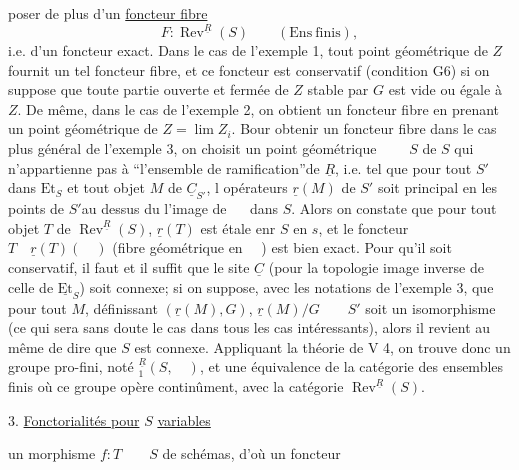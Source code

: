 %
poser de plus d'un \uline{foncteur fibre}
\[
F:\operatorname{Rev}^{\underline{R}}(S)\qquad(\mathrm{Ens\ finis}),
\]
i.e. d'un foncteur exact. Dans le cas de l'exemple 1, tout point géométrique de $Z$ fournit un tel foncteur fibre, et ce foncteur est conservatif (condition G6) si on suppose que toute partie ouverte et fermée de $Z$ stable par $G$ est vide ou égale à $Z$. De même, dans le cas de l'exemple 2, on obtient un  foncteur fibre en prenant un point géométrique de $Z=\lim Z_i$. Bour obtenir un foncteur fibre dans le cas plus général de l'exemple 3, on choisit un point géométrique $\qquad S$ de $S$  qui n'appartienne pas à ``l'ensemble de ramification''de $\underline{R}$, i.e. tel que pour tout $S'$ dans $\mathrm{Et}_S$ et tout objet $M$ de $\underline{C}_{S'}$, l    opérateurs $\underline{r}(M)$  de $S'$ soit principal en les points de $S'$au dessus du l'image  de $\quad$ dans $S$. Alors   on constate que pour tout objet $T$ de $\operatorname{Rev}^{\underline{R}}(S)$, $\underline{r}(T)$ est étale enr $S$ en $s$, et le foncteur $T\quad\underline{r}(T)(\quad)$ (fibre géométrique en $\quad$) est bien exact. Pour qu'il soit conservatif, il faut et il suffit que le site $\underline{C}$ (pour la topologie image inverse de celle de $\underline{\mathrm{Et}}_S$) soit connexe;  si on suppose, avec les notations de l'exemple 3, que pour tout $M$, définissant $(\underline{r}(M),G)$, $\underline{r}(M)/G\qquad S'$ soit un isomorphisme (ce qui sera sans doute le cas dans tous les cas intéressants), alors il revient au même de dire que $S$ est connexe. Appliquant la théorie de V 4, on trouve donc un groupe pro-fini, noté ${}^{\underline{R}}_1(S,\quad)$,  et une équivalence de la catégorie des ensembles finis où ce groupe opère continûment, avec la catégorie $\operatorname{Rev}^{\underline{R}}(S)$.

3. \uline{Fonctorialités pour} $S$  \uline{variables}

 un morphisme $f:T\qquad S$ de schémas, d'où un foncteur

